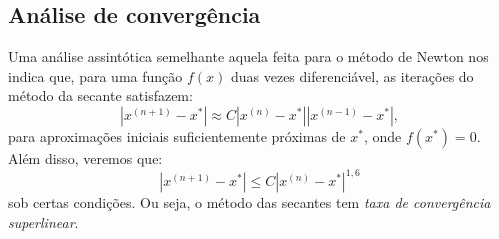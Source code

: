 \subsection{Análise de convergência}

Uma análise assintótica semelhante aquela feita para o método de Newton nos indica que, para uma função $f(x)$ duas vezes diferenciável, as iterações do método da secante satisfazem:
\begin{equation*}
  |x^{(n+1)} - x^*| \approx C |x^{(n)} - x^*||x^{(n-1)} - x^*|,
\end{equation*}
para aproximações iniciais suficientemente próximas de $x^*$, onde $f(x^*) = 0$. Além disso, veremos que:
\begin{equation*}
  |x^{(n+1)} - x^*| \leq C |x^{(n)} - x^*|^{1,6}
\end{equation*}
sob certas condições. Ou seja, o método das secantes tem \emph{taxa de convergência superlinear}.

